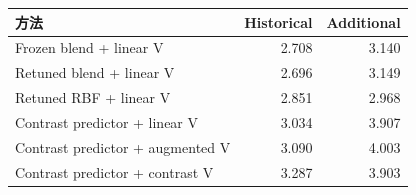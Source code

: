 \begin{tabular}{lrr}\toprule 方法 & Historical & Additional\\\midrule
Frozen blend + linear V & 2.708 & 3.140\\
Retuned blend + linear V & 2.696 & 3.149\\
Retuned RBF + linear V & 2.851 & 2.968\\
Contrast predictor + linear V & 3.034 & 3.907\\
Contrast predictor + augmented V & 3.090 & 4.003\\
Contrast predictor + contrast V & 3.287 & 3.903\\
\bottomrule\end{tabular}